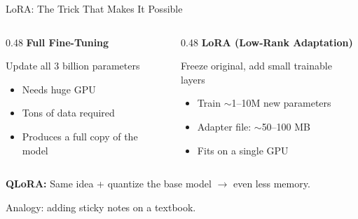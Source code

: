 \documentclass[aspectratio=169]{beamer}
\begin{document}
\begin{frame}{LoRA: The Trick That Makes It Possible}
    \begin{columns}[T]
        \begin{column}{0.48\textwidth}
            \textbf{Full Fine-Tuning}

            \vspace{0.5em}
            \begin{tcolorbox}[colback=red!5, colframe=red!40, boxrule=0.5pt, arc=2pt]
                Update all 3 billion parameters

                \vspace{0.3em}
                {\small
                \begin{itemize}
                    \item Needs huge GPU
                    \item Tons of data required
                    \item Produces a full copy of the model
                \end{itemize}
                }
            \end{tcolorbox}
        \end{column}
        \begin{column}{0.48\textwidth}
            \textbf{LoRA (Low-Rank Adaptation)}

            \vspace{0.5em}
            \begin{tcolorbox}[colback=green!5, colframe=green!40, boxrule=0.5pt, arc=2pt]
                Freeze original, add small trainable layers

                \vspace{0.3em}
                {\small
                \begin{itemize}
                    \item Train $\sim$1--10M new parameters
                    \item Adapter file: $\sim$50--100 MB
                    \item Fits on a single GPU
                \end{itemize}
                }
            \end{tcolorbox}
        \end{column}
    \end{columns}

    \vspace{1em}
    \textbf{QLoRA:} Same idea + quantize the base model $\rightarrow$ even less memory.

    \vspace{0.5em}
    Analogy: adding sticky notes on a textbook.
\end{frame}
\end{document}
